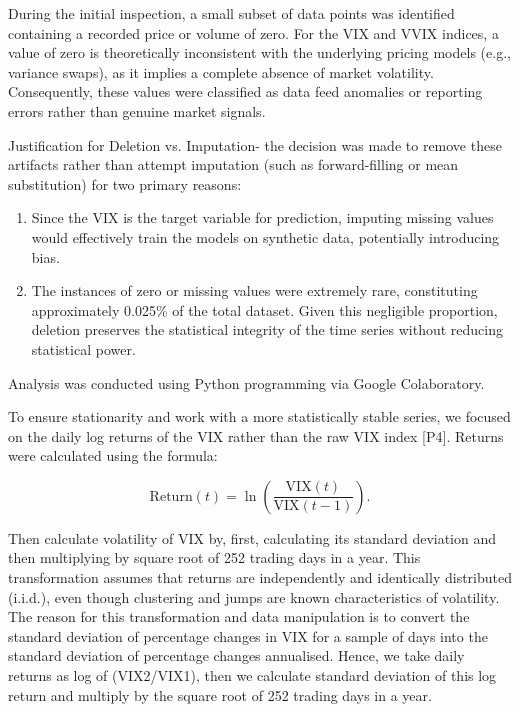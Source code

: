 \documentclass[12pt,a4paper]{report}
\numberwithin{equation}{section}
\begin{document}
During the initial inspection, a small subset of data points was identified containing a recorded price or volume of zero. For the VIX and VVIX indices, a value of zero is theoretically inconsistent with the underlying pricing models (e.g., variance swaps), as it implies a complete absence of market volatility. Consequently, these values were classified as data feed anomalies or reporting errors rather than genuine market signals.

Justification for Deletion vs. Imputation- the decision was made to remove these artifacts rather than attempt imputation (such as forward-filling or mean substitution) for two primary reasons:
\begin{enumerate}
    \item {} Since the VIX is the target variable for prediction, imputing missing values would effectively train the models on synthetic data, potentially introducing bias.
    \item {} The instances of zero or missing values were extremely rare, constituting approximately 0.025\% of the total dataset. Given this negligible proportion, deletion preserves the statistical integrity of the time series without reducing statistical power.
\end{enumerate}

Analysis was
conducted using Python programming via Google Colaboratory. 

To ensure stationarity and work with a more statistically stable series,
we focused on the daily log returns of the VIX rather than the raw VIX
index [P4]. Returns were calculated using the formula:

\begin{equation}\label{eq:3.1.1}
\mathrm{Return}(t)
= \ln\!\left(\frac{\mathrm{VIX}(t)}{\mathrm{VIX}(t-1)}\right).
\end{equation}


Then calculate volatility of VIX by, first, calculating its standard
deviation and then multiplying by square root of 252 trading days in a
year. This transformation assumes that returns are independently and
identically distributed (i.i.d.), even though clustering and jumps are
known characteristics of volatility. The reason for this transformation
and data manipulation is to convert the standard deviation of percentage
changes in VIX for a sample of days into the standard deviation of
percentage changes annualised. Hence, we take daily returns as log of
(VIX2/VIX1), then we calculate standard deviation of this log return and
multiply by the square root of 252 trading days in a year.
\end{document}
